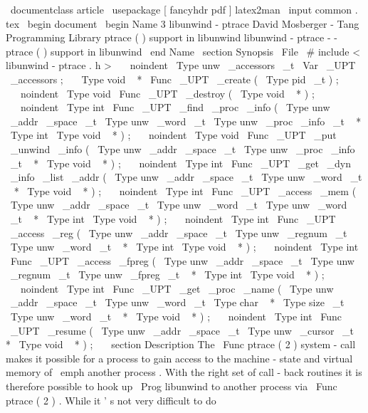 \
documentclass
{
article
}
\
usepackage
[
fancyhdr
pdf
]
{
latex2man
}
\
input
{
common
.
tex
}
\
begin
{
document
}
\
begin
{
Name
}
{
3
}
{
libunwind
-
ptrace
}
{
David
Mosberger
-
Tang
}
{
Programming
Library
}
{
ptrace
(
)
support
in
libunwind
}
libunwind
-
ptrace
-
-
ptrace
(
)
support
in
libunwind
\
end
{
Name
}
\
section
{
Synopsis
}
\
File
{
\
#
include
<
libunwind
-
ptrace
.
h
>
}
\
\
\
noindent
\
Type
{
unw
\
_accessors
\
_t
}
\
Var
{
\
_UPT
\
_accessors
}
;
\
\
\
Type
{
void
~
*
}
\
Func
{
\
_UPT
\
_create
}
(
\
Type
{
pid
\
_t
}
)
;
\
\
\
noindent
\
Type
{
void
}
\
Func
{
\
_UPT
\
_destroy
}
(
\
Type
{
void
~
*
}
)
;
\
\
\
noindent
\
Type
{
int
}
\
Func
{
\
_UPT
\
_find
\
_proc
\
_info
}
(
\
Type
{
unw
\
_addr
\
_space
\
_t
}
\
Type
{
unw
\
_word
\
_t
}
\
Type
{
unw
\
_proc
\
_info
\
_t
~
*
}
\
Type
{
int
}
\
Type
{
void
~
*
}
)
;
\
\
\
noindent
\
Type
{
void
}
\
Func
{
\
_UPT
\
_put
\
_unwind
\
_info
}
(
\
Type
{
unw
\
_addr
\
_space
\
_t
}
\
Type
{
unw
\
_proc
\
_info
\
_t
~
*
}
\
Type
{
void
~
*
}
)
;
\
\
\
noindent
\
Type
{
int
}
\
Func
{
\
_UPT
\
_get
\
_dyn
\
_info
\
_list
\
_addr
}
(
\
Type
{
unw
\
_addr
\
_space
\
_t
}
\
Type
{
unw
\
_word
\
_t
~
*
}
\
Type
{
void
~
*
}
)
;
\
\
\
noindent
\
Type
{
int
}
\
Func
{
\
_UPT
\
_access
\
_mem
}
(
\
Type
{
unw
\
_addr
\
_space
\
_t
}
\
Type
{
unw
\
_word
\
_t
}
\
Type
{
unw
\
_word
\
_t
~
*
}
\
Type
{
int
}
\
Type
{
void
~
*
}
)
;
\
\
\
noindent
\
Type
{
int
}
\
Func
{
\
_UPT
\
_access
\
_reg
}
(
\
Type
{
unw
\
_addr
\
_space
\
_t
}
\
Type
{
unw
\
_regnum
\
_t
}
\
Type
{
unw
\
_word
\
_t
~
*
}
\
Type
{
int
}
\
Type
{
void
~
*
}
)
;
\
\
\
noindent
\
Type
{
int
}
\
Func
{
\
_UPT
\
_access
\
_fpreg
}
(
\
Type
{
unw
\
_addr
\
_space
\
_t
}
\
Type
{
unw
\
_regnum
\
_t
}
\
Type
{
unw
\
_fpreg
\
_t
~
*
}
\
Type
{
int
}
\
Type
{
void
~
*
}
)
;
\
\
\
noindent
\
Type
{
int
}
\
Func
{
\
_UPT
\
_get
\
_proc
\
_name
}
(
\
Type
{
unw
\
_addr
\
_space
\
_t
}
\
Type
{
unw
\
_word
\
_t
}
\
Type
{
char
~
*
}
\
Type
{
size
\
_t
}
\
Type
{
unw
\
_word
\
_t
~
*
}
\
Type
{
void
~
*
}
)
;
\
\
\
noindent
\
Type
{
int
}
\
Func
{
\
_UPT
\
_resume
}
(
\
Type
{
unw
\
_addr
\
_space
\
_t
}
\
Type
{
unw
\
_cursor
\
_t
~
*
}
\
Type
{
void
~
*
}
)
;
\
\
\
section
{
Description
}
The
\
Func
{
ptrace
}
(
2
)
system
-
call
makes
it
possible
for
a
process
to
gain
access
to
the
machine
-
state
and
virtual
memory
of
\
emph
{
another
}
process
.
With
the
right
set
of
call
-
back
routines
it
is
therefore
possible
to
hook
up
\
Prog
{
libunwind
}
to
another
process
via
\
Func
{
ptrace
}
(
2
)
.
While
it
'
s
not
very
difficult
to
do
